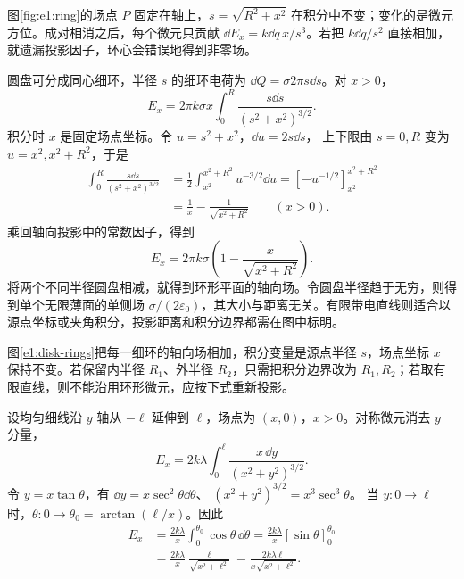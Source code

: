 图\ref{fig:e1:ring}的场点 $P$ 固定在轴上，$s=\sqrt{R^2+x^2}$ 在积分中不变；变化的是微元方位。成对相消之后，每个微元只贡献 $\dd E_x=k\dd q\,x/s^3$。若把 $k\dd q/s^2$ 直接相加，就遗漏投影因子，环心会错误地得到非零场。

圆盘可分成同心细环，半径 $s$ 的细环电荷为 $\dd Q=\sigma2\pi s\dd s$。对 $x>0$，
\[
 E_x=2\pi k\sigma x\int_0^R\frac{s\dd s}{(s^2+x^2)^{3/2}}.
\]
积分时 $x$ 是固定场点坐标。令 $u=s^2+x^2$，$\dd u=2s\dd s$，
上下限由 $s=0,R$ 变为 $u=x^2,x^2+R^2$，于是
\begin{align*}
 \int_0^R\frac{s\dd s}{(s^2+x^2)^{3/2}}
 &=\frac12\int_{x^2}^{x^2+R^2}u^{-3/2}\dd u
 =[-u^{-1/2}]_{x^2}^{x^2+R^2}\\
 &=\frac1x-\frac1{\sqrt{x^2+R^2}}\qquad(x>0).
\end{align*}
乘回轴向投影中的常数因子，得到
\[
 E_x=2\pi k\sigma\left(1-\frac{x}{\sqrt{x^2+R^2}}\right).
\]
将两个不同半径圆盘相减，就得到环形平面的轴向场。令圆盘半径趋于无穷，则得到单个无限薄面的单侧场 $\sigma/(2\varepsilon_0)$，其大小与距离无关。有限带电直线则适合以源点坐标或夹角积分，投影距离和积分边界都需在图中标明。


图\ref{e1:disk-rings}把每一细环的轴向场相加，积分变量是源点半径 $s$，场点坐标 $x$ 保持不变。若保留内半径 $R_1$、外半径 $R_2$，只需把积分边界改为 $R_1,R_2$；若取有限直线，则不能沿用环形微元，应按下式重新投影。

设均匀细线沿 $y$ 轴从 $-\ell$ 延伸到 $\ell$，场点为 $(x,0)$，$x>0$。对称微元消去 $y$ 分量，
\[
E_x=2k\lambda\int_0^\ell\frac{x\,\dd y}{(x^2+y^2)^{3/2}}.
\]
令 $y=x\tan\theta$，有 $\dd y=x\sec^2\theta\dd\theta$、
$(x^2+y^2)^{3/2}=x^3\sec^3\theta$。
当 $y:0\to\ell$ 时，$\theta:0\to\theta_0=\arctan(\ell/x)$。因此
\begin{align*}
 E_x&=\frac{2k\lambda}{x}\int_0^{\theta_0}\cos\theta\,\dd\theta
 =\frac{2k\lambda}{x}[\sin\theta]_0^{\theta_0}\\
 &=\frac{2k\lambda}{x}\frac{\ell}{\sqrt{x^2+\ell^2}}
 =\frac{2k\lambda\ell}{x\sqrt{x^2+\ell^2}}.
\end{align*}


